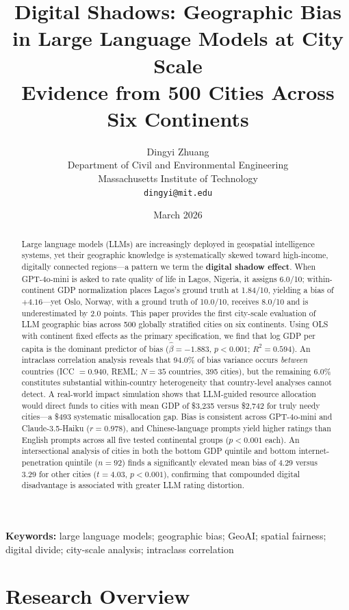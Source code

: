 \documentclass[12pt]{article}
\title{\textbf{Digital Shadows: Geographic Bias in Large Language Models at City Scale}\\[0.5em]
\large Evidence from 500 Cities Across Six Continents}
\author{Dingyi Zhuang\\
\small Department of Civil and Environmental Engineering\\
\small Massachusetts Institute of Technology\\
\small \texttt{dingyi@mit.edu}}
\date{March 2026}
\begin{document}
\maketitle

\begin{abstract}
Large language models (LLMs) are increasingly deployed in geospatial intelligence systems, yet their geographic knowledge is systematically skewed toward high-income, digitally connected regions---a pattern we term the \textbf{digital shadow effect}. When GPT-4o-mini is asked to rate quality of life in Lagos, Nigeria, it assigns 6.0/10; within-continent GDP normalization places Lagos's ground truth at 1.84/10, yielding a bias of $+4.16$---yet Oslo, Norway, with a ground truth of 10.0/10, receives 8.0/10 and is underestimated by 2.0 points. This paper provides the first city-scale evaluation of LLM geographic bias across 500 globally stratified cities on six continents. Using OLS with continent fixed effects as the primary specification, we find that log GDP per capita is the dominant predictor of bias ($\hat{\beta} = -1.883$, $p < 0.001$; $R^2 = 0.594$). An intraclass correlation analysis reveals that 94.0\% of bias variance occurs \emph{between} countries (ICC $= 0.940$, REML; $N = 35$ countries, 395 cities), but the remaining 6.0\% constitutes substantial within-country heterogeneity that country-level analyses cannot detect. A real-world impact simulation shows that LLM-guided resource allocation would direct funds to cities with mean GDP of \$3,235 versus \$2,742 for truly needy cities---a \$493 systematic misallocation gap. Bias is consistent across GPT-4o-mini and Claude-3.5-Haiku ($r = 0.978$), and Chinese-language prompts yield higher ratings than English prompts across all five tested continental groups ($p < 0.001$ each). An intersectional analysis of cities in both the bottom GDP quintile and bottom internet-penetration quintile ($n = 92$) finds a significantly elevated mean bias of 4.29 versus 3.29 for other cities ($t = 4.03$, $p < 0.001$), confirming that compounded digital disadvantage is associated with greater LLM rating distortion.
\end{abstract}

\bigskip
\noindent\textbf{Keywords:} large language models; geographic bias; GeoAI; spatial fairness; digital divide; city-scale analysis; intraclass correlation

\newpage

\section*{Research Overview}
\end{document}
